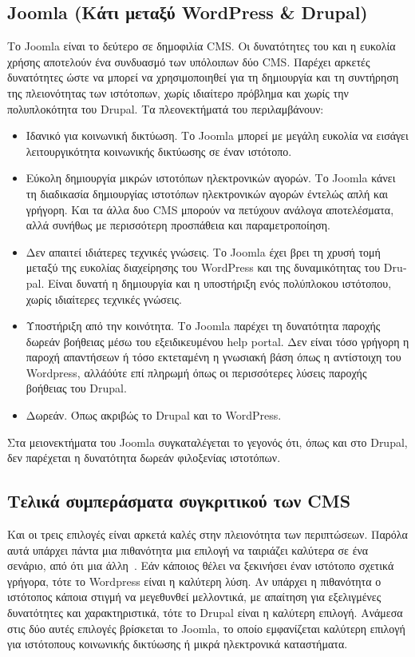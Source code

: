 \documentclass[12pt]{report}
\begin{document}
\subsection{\textlatin{Joomla} (Κάτι μεταξύ \textlatin{WordPress \& Drupal})}
Το \textlatin{Joomla} είναι το δεύτερο σε δημοφιλία \textlatin{CMS}. Οι δυνατότητες του και η ευκολία χρήσης αποτελούν ένα συνδυασμό των υπόλοιπων δύο \textlatin{CMS}. Παρέχει αρκετές δυνατότητες ώστε να μπορεί να χρησιμοποιηθεί για τη δημιουργία και τη συντήρηση της πλειονότητας των ιστότοπων, χωρίς ιδιαίτερο πρόβλημα και χωρίς την πολυπλοκότητα του \textlatin{Drupal}.
Τα πλεονεκτήματά του περιλαμβάνουν:
\begin{itemize}
\item Ιδανικό για κοινωνική δικτύωση. Το \textlatin{Joomla} μπορεί με μεγάλη ευκολία να εισάγει λειτουργικότητα κοινωνικής δικτύωσης σε έναν ιστότοπο.
\item Εύκολη δημιουργία μικρών ιστοτόπων ηλεκτρονικών αγορών. Το \textlatin{Joomla} κάνει τη διαδικασία δημιουργίας ιστοτόπων ηλεκτρονικών αγορών έντελώς απλή και γρήγορη. Και τα άλλα δυο \textlatin{CMS} μπορούν να πετύχουν ανάλογα αποτελέσματα, αλλά συνήθως με περισσότερη προσπάθεια και παραμετροποίηση.
\item Δεν απαιτεί ιδιάτερες τεχνικές γνώσεις. Το \textlatin{Joomla} έχει βρει τη χρυσή τομή μεταξύ της ευκολίας διαχείρησης του \textlatin{WordPress} και της δυναμικότητας του \textlatin{Drupal}. Είναι δυνατή η δημιουργία και η υποστήριξη ενός πολύπλοκου ιστότοπου, χωρίς ιδιαίτερες τεχνικές γνώσεις.
\item Υποστήριξη από την κοινότητα. Το \textlatin{Joomla} παρέχει τη δυνατότητα παροχής δωρεάν βοήθειας μέσω του εξειδικευμένου \textlatin{help portal}. Δεν είναι τόσο γρήγορη η παροχή απαντήσεων ή τόσο εκτεταμένη η γνωσιακή βάση όπως η αντίστοιχη του \textlatin{Wordpress}, αλλάόύτε επί πληρωμή όπως οι περισσότερες λύσεις παροχής βοήθειας του \textlatin{Drupal}.
\item Δωρεάν. Όπως ακριβώς το \textlatin{Drupal} και το \textlatin{WordPress}.
\end{itemize}

Στα μειονεκτήματα του \textlatin{Joomla} συγκαταλέγεται το γεγονός ότι, όπως και στο \textlatin{Drupal}, δεν παρέχεται η δυνατότητα δωρεάν φιλοξενίας ιστοτόπων.

\subsection{Τελικά συμπεράσματα συγκριτικού των \textlatin{CMS}}
Και οι τρεις επιλογές είναι αρκετά καλές στην πλειονότητα των περιπτώσεων. Παρόλα αυτά υπάρχει πάντα μια πιθανότητα μια επιλογή να ταιριάζει καλύτερα σε ένα σενάριο, από ότι μια άλλη~\cite{make_a_website_hub_2017}. Εάν κάποιος θέλει να ξεκινήσει έναν ιστότοπο σχετικά γρήγορα, τότε το \textlatin{Wordpress} είναι η καλύτερη λύση. Αν υπάρχει η πιθανότητα ο ιστότοπος κάποια στιγμή να μεγεθυνθεί μελλοντικά, με απαίτηση για εξελιγμένες δυνατότητες και χαρακτηριστικά, τότε το \textlatin{Drupal} είναι η καλύτερη επιλογή. Ανάμεσα στις δύο αυτές επιλογές βρίσκεται το \textlatin{Joomla}, το οποίο εμφανίζεται καλύτερη επιλογή για ιστότοπους κοινωνικής δικτύωσης ή μικρά ηλεκτρονικά καταστήματα.
\end{document}
